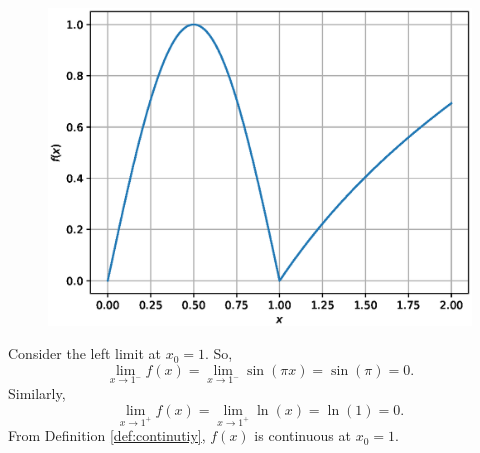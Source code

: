\documentclass[journal,12pt,twocolumn]{IEEEtran}
\begin{document}

\begin{figure}[!ht]
\begin{center}
\includegraphics[width=\columnwidth]{./figs/4.eps}
\end{center}
\label{fig:4}	
\end{figure} 

Consider the left limit at $x_0=1$. 
So, 
\begin{equation}
\lim_{x \to 1^-} f(x)=\lim_{x\to 1^{-}} \sin(\pi x)=\sin(\pi)=0.
\end{equation}
%
Similarly, 
\begin{equation}
\lim_{x \to 1^+} f(x)=\lim_{x \to 1^{+}} \ln(x)=\ln(1)=0.
\end{equation}
From Definition \ref{def:continutiy},
$f(x)$ is continuous at $x_0=1$.
\end{document}

